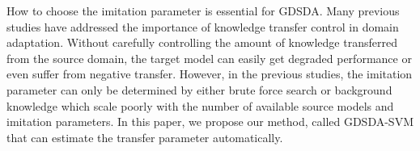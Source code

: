 How to choose the imitation parameter is essential for GDSDA.
Many previous studies have addressed the importance of knowledge transfer control in domain adaptation\cite{duan2012learning,duan2012visual}. Without carefully controlling the amount of knowledge transferred from the source domain, the target model can easily get degraded performance or even suffer from negative transfer\cite{pan2010survey}. However, in the previous studies, the imitation parameter can only be determined by either brute force search\cite{lopez2015unifying} or background knowledge\cite{Tzeng_2015_ICCV} which scale poorly with the number of available source models and imitation parameters.
In this paper, we propose our method, called GDSDA-SVM that can estimate the transfer parameter automatically.



